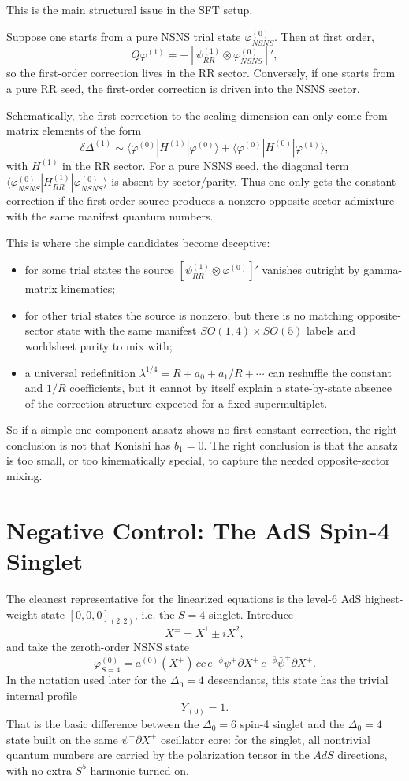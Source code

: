 \documentclass[12pt]{article}
\def\be{\begin{equation}}
\def\ee{\end{equation}}
\newcommand{\D}{\ensuremath{\Delta}}
\begin{document}
This is the main structural issue in the SFT setup.

Suppose one starts from a pure NSNS trial state $\varphi^{(0)}_{NSNS}$. Then at first order,
\be
Q\varphi^{(1)}=-[\psi^{(1)}_{RR}\otimes \varphi^{(0)}_{NSNS}]',
\ee
so the first-order correction lives in the RR sector. Conversely, if one starts from a pure RR seed,
the first-order correction is driven into the NSNS sector.

Schematically, the first correction to the scaling dimension can only come from matrix elements of the form
\be
\delta \D^{(1)}\sim
\langle \varphi^{(0)}|H^{(1)}|\varphi^{(0)}\rangle
+\langle \varphi^{(0)}|H^{(0)}|\varphi^{(1)}\rangle,
\ee
with $H^{(1)}$ in the RR sector. For a pure NSNS seed, the diagonal term
$\langle \varphi^{(0)}_{NSNS}|H^{(1)}_{RR}|\varphi^{(0)}_{NSNS}\rangle$ is absent by sector/parity.
Thus one only gets the constant correction if the first-order source produces a nonzero opposite-sector
admixture with the same manifest quantum numbers.

This is where the simple candidates become deceptive:
\begin{itemize}
\item for some trial states the source $[\psi^{(1)}_{RR}\otimes \varphi^{(0)}]'$ vanishes outright by gamma-matrix kinematics;
\item for other trial states the source is nonzero, but there is no matching opposite-sector state with the same
manifest $SO(1,4)\times SO(5)$ labels and worldsheet parity to mix with;
\item a universal redefinition $\lambda^{1/4}=R+a_0+a_1/R+\cdots$ can reshuffle the constant and $1/R$ coefficients,
but it cannot by itself explain a state-by-state absence of the correction structure expected for a fixed supermultiplet.
\end{itemize}

So if a simple one-component ansatz shows no first constant correction, the right conclusion is not
that Konishi has $b_1=0$. The right conclusion is that the ansatz is too small, or too kinematically special,
to capture the needed opposite-sector mixing.

\section{Negative Control: The AdS Spin-4 Singlet}

The cleanest representative for the linearized equations is the level-6 AdS highest-weight state
$[0,0,0]_{(2,2)}$, i.e. the $S=4$ singlet. Introduce
\be
X^\pm = X^1 \pm i X^2,
\ee
and take the zeroth-order NSNS state
\be
\varphi^{(0)}_{S=4}
=a^{(0)}(X^+) \,
c\bar c\, e^{-\phi}\psi^+\partial X^+\,
e^{-\bar\phi}\bar\psi^+\bar\partial X^+.
\label{S4ansatz}
\ee
In the notation used later for the $\D_0=4$ descendants, this state has the trivial internal profile
\be
Y_{(0)}=1.
\ee
That is the basic difference between the $\D_0=6$ spin-4 singlet and the $\D_0=4$ state built on the same
$\psi^+\partial X^+$ oscillator core: for the singlet, all nontrivial quantum numbers are carried by the
polarization tensor in the $AdS$ directions, with no extra $S^5$ harmonic turned on.
\end{document}

